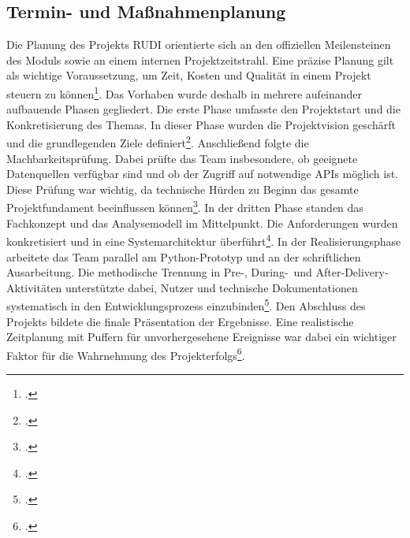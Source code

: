 \documentclass[12pt]{article}
\begin{document}
\subsection{Termin- und Maßnahmenplanung}
Die Planung des Projekts RUDI orientierte sich an den offiziellen Meilensteinen des 
Moduls sowie an einem internen Projektzeitstrahl. Eine präzise Planung gilt als 
wichtige Voraussetzung, um Zeit, Kosten und Qualität in einem Projekt steuern zu 
können\footcite[Vgl.][517]{sitnikov-2024}. Das Vorhaben wurde deshalb in mehrere 
aufeinander aufbauende Phasen gegliedert. 
Die erste Phase umfasste den Projektstart und die Konkretisierung des Themas. In 
dieser Phase wurden die Projektvision geschärft und die grundlegenden Ziele 
definiert\footcite[Vgl.][2]{couto-2022}. Anschließend folgte die Machbarkeitsprüfung. 
Dabei prüfte das Team insbesondere, ob geeignete Datenquellen verfügbar sind und 
ob der Zugriff auf notwendige APIs möglich ist. Diese Prüfung war wichtig, da 
technische Hürden zu Beginn das gesamte Projektfundament beeinflussen 
können\footcite[Vgl.][517--518]{sitnikov-2024}. 
In der dritten Phase standen das Fachkonzept und das Analysemodell im Mittelpunkt. 
Die Anforderungen wurden konkretisiert und in eine Systemarchitektur 
überführt\footcite[Vgl.][11--12]{alzahrani-2025}. In der Realisierungsphase 
arbeitete das Team parallel am Python-Prototyp und an der schriftlichen Ausarbeitung. 
Die methodische Trennung in \glqq Pre-\grqq, \glqq During-\grqq\ und 
\glqq After-Delivery\grqq-Aktivitäten unterstützte dabei, Nutzer und technische 
Dokumentationen systematisch in den Entwicklungsprozess einzubinden\footcite[Vgl.][8]{alzahrani-2025}. 
Den Abschluss des Projekts bildete die finale Präsentation der Ergebnisse. Eine 
realistische Zeitplanung mit Puffern für unvorhergesehene Ereignisse war dabei ein 
wichtiger Faktor für die Wahrnehmung des Projekterfolgs\footcite[Vgl.][6--7]{bogopa-2022}.
\end{document}
